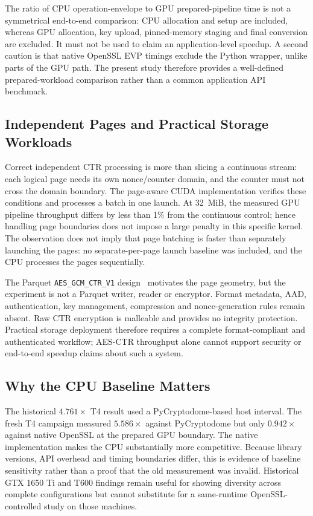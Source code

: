 The ratio of CPU operation-envelope to GPU prepared-pipeline time is not a
symmetrical end-to-end comparison: CPU allocation and setup are included,
whereas GPU allocation, key upload, pinned-memory staging and final conversion
are excluded. It must not be used to claim an application-level speedup.
A second caution is that native OpenSSL EVP timings exclude the Python
wrapper, unlike parts of the GPU path. The present study therefore provides
a well-defined prepared-workload comparison rather than a common application
API benchmark.

\subsection{Independent Pages and Practical Storage Workloads}
Correct independent CTR processing is more than slicing a continuous stream:
each logical page needs its own nonce/counter domain, and the counter must not
cross the domain boundary. The page-aware CUDA implementation verifies these
conditions and processes a batch in one launch. At 32~MiB, the measured GPU
pipeline throughput differs by less than 1\% from the continuous control;
hence handling page boundaries does not impose a large penalty in this
specific kernel. The observation does not imply that page batching is faster
than separately launching the pages: no separate-per-page launch baseline was
included, and the CPU processes the pages sequentially.

The Parquet \texttt{AES\_GCM\_CTR\_V1} design~\cite{parquet_encryption_spec} motivates the page geometry, but
the experiment is not a Parquet writer, reader or encryptor. Format metadata,
AAD, authentication, key management, compression and nonce-generation rules
remain absent. Raw CTR encryption is malleable and provides no integrity
protection. Practical storage deployment therefore requires a complete
format-compliant and authenticated workflow; AES-CTR throughput alone cannot
support security or end-to-end speedup claims about such a system.

\subsection{Why the CPU Baseline Matters}
The historical $4.761\times$ T4 result used a PyCryptodome-based host interval.
The fresh T4 campaign measured $5.586\times$ against PyCryptodome but only
$0.942\times$ against native OpenSSL at the prepared GPU boundary. The native
implementation makes the CPU substantially more competitive. Because library
versions, API overhead and timing boundaries differ, this is evidence of
baseline sensitivity rather than a proof that the old measurement was invalid.
Historical GTX 1650 Ti and T600 findings remain useful for showing diversity
across complete configurations but cannot substitute for a same-runtime
OpenSSL-controlled study on those machines.


